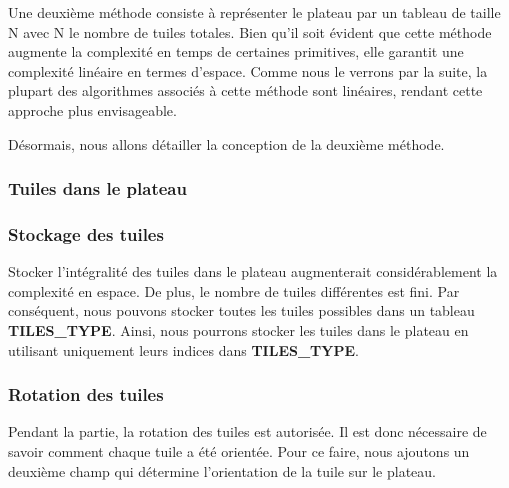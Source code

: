 \documentclass[10pt]{article}
\begin{document}
Une deuxième méthode consiste à représenter le plateau par un tableau de taille N avec N le nombre de tuiles totales. Bien qu'il soit évident que cette méthode augmente la complexité en temps de certaines primitives, elle garantit une complexité linéaire en termes d'espace. Comme nous le verrons par la suite, la plupart des algorithmes associés à cette méthode sont linéaires, rendant cette approche plus envisageable.

Désormais, nous allons détailler la conception de la deuxième méthode.
\subsubsection{Tuiles dans le plateau}
\subsubsection*{Stockage des tuiles}
Stocker l'intégralité des tuiles dans le plateau augmenterait considérablement la complexité en espace. De plus, le nombre de tuiles différentes est fini. Par conséquent, nous pouvons stocker toutes les tuiles possibles dans un tableau \textbf{TILES\_TYPE}. Ainsi, nous pourrons stocker les tuiles dans le plateau en utilisant uniquement leurs indices dans \textbf{TILES\_TYPE}.
\subsubsection*{Rotation des tuiles}
Pendant la partie, la rotation des tuiles est autorisée. Il est donc nécessaire de savoir comment chaque tuile a été orientée. Pour ce faire, nous ajoutons un deuxième champ qui détermine l'orientation de la tuile sur le plateau.
\end{document}
